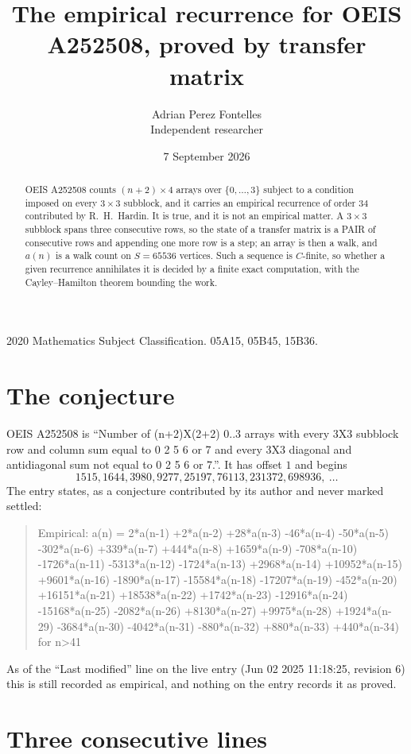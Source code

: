 \documentclass[11pt,a4paper]{article}
\title{The empirical recurrence for OEIS A252508, proved by transfer matrix}
\author{Adrian Perez Fontelles\\ \small Independent researcher}
\date{7 September 2026}
\theoremstyle{plain}
\theoremstyle{definition}
\begin{document}
\maketitle

\begin{abstract}
OEIS A252508 counts $(n+2)\times4$ arrays over $\{0,\dots,3\}$ subject to a condition imposed on
every $3\times3$ subblock, and it carries an empirical recurrence of order $34$
contributed by R.~H.~Hardin. It is true, and it is not an empirical matter. A $3\times3$
subblock spans three consecutive rows, so the state of a transfer matrix is a PAIR of
consecutive rows and appending one more row is a step; an array is then a walk, and
$a(n)$ is a walk count on $S=65536$ vertices. Such a sequence is $C$-finite, so whether a given
recurrence annihilates it is decided by a finite exact computation, with the Cayley--Hamilton
theorem bounding the work.
\end{abstract}

\noindent\small 2020 Mathematics Subject Classification. 05A15, 05B45, 15B36.\normalsize

\section{The conjecture}

OEIS A252508 is ``Number of (n+2)X(2+2) 0..3 arrays with every 3X3 subblock row and column sum equal to 0 2 5 6 or 7 and every 3X3 diagonal and antidiagonal sum not equal to 0 2 5 6 or 7.''. It has offset $1$ and begins
\[
1515, 1644, 3980, 9277, 25197, 76113, 231372, 698936,\ \dots
\]
The entry states, as a conjecture contributed by its author and never marked settled:
\begin{quote}
Empirical: a(n) = 2*a(n-1) +2*a(n-2) +28*a(n-3) -46*a(n-4) -50*a(n-5) -302*a(n-6) +339*a(n-7) +444*a(n-8) +1659*a(n-9) -708*a(n-10) -1726*a(n-11) -5313*a(n-12) -1724*a(n-13) +2968*a(n-14) +10952*a(n-15) +9601*a(n-16) -1890*a(n-17) -15584*a(n-18) -17207*a(n-19) -452*a(n-20) +16151*a(n-21) +18538*a(n-22) +1742*a(n-23) -12916*a(n-24) -15168*a(n-25) -2082*a(n-26) +8130*a(n-27) +9975*a(n-28) +1924*a(n-29) -3684*a(n-30) -4042*a(n-31) -880*a(n-32) +880*a(n-33) +440*a(n-34) for n>41
\end{quote}
As of the ``Last modified'' line on the live entry (Jun 02 2025 11:18:25, revision 6) this is still
recorded as empirical, and nothing on the entry records it as proved.

\section{Three consecutive lines}
\end{document}
